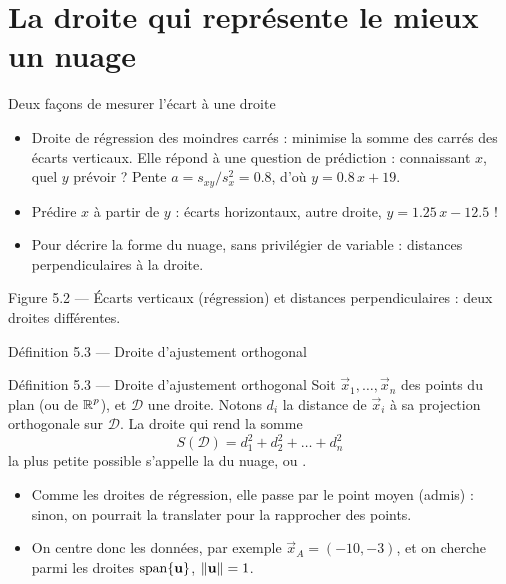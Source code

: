 \section{La droite qui représente le mieux un nuage}

\begin{frame}{Deux façons de mesurer l'écart à une droite}
  \small
  \begin{itemize}
    \item Droite de régression des moindres carrés : minimise la somme des
      carrés des écarts verticaux. Elle répond à une question de
      prédiction : connaissant $x$, quel $y$ prévoir ? Pente
      $a=s_{xy}/s_x^2=\num{0.8}$, d'où $y=\num{0.8}\,x+19$.
    \item Prédire $x$ à partir de $y$ : écarts horizontaux, autre droite,
      $y=\num{1.25}\,x-\num{12.5}$ !
    \item Pour décrire la forme du nuage, sans privilégier de variable :
      distances perpendiculaires à la droite.
  \end{itemize}
  \centering\scriptsize Figure 5.2 --- Écarts verticaux (régression) et
  distances perpendiculaires : deux droites différentes.
\end{frame}

\begin{frame}{Définition 5.3 --- Droite d'ajustement orthogonal}
  \begin{Enonce}{Définition 5.3 --- Droite d'ajustement orthogonal}
    Soit $\vec x_1,\dots,\vec x_n$ des points du plan (ou de $\operatorname{\mathbb{R}}^p$), et
    $\mathcal D$ une droite. Notons $d_i$ la distance de $\vec x_i$ à sa
    projection orthogonale sur $\mathcal D$. La droite qui rend la somme
    \[
      S(\mathcal D)=d_1^2+d_2^2+\dots+d_n^2
    \]
    la plus petite possible s'appelle la  du nuage, ou .
  \end{Enonce}
  \begin{itemize}
    \item Comme les droites de régression, elle passe par le point moyen
      (admis) : sinon, on pourrait la translater pour la rapprocher des
      points.
    \item On centre donc les données, par exemple $\vec x_A=(-10,-3)$, et on
      cherche parmi les droites $\operatorname{span}\{\mathbf{u}\}$, $\lVert \mathbf{u} \rVert=1$.
  \end{itemize}
\end{frame}

